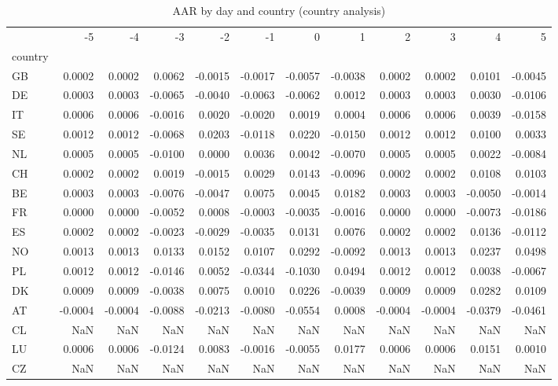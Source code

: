 \begin{table}
\caption{AAR by day and country (country analysis)}
\label{tab:country_aar}
\begin{tabular}{lrrrrrrrrrrr}
\toprule
 & -5 & -4 & -3 & -2 & -1 & 0 & 1 & 2 & 3 & 4 & 5 \\
country &  &  &  &  &  &  &  &  &  &  &  \\
\midrule
GB & 0.0002 & 0.0002 & 0.0062 & -0.0015 & -0.0017 & -0.0057 & -0.0038 & 0.0002 & 0.0002 & 0.0101 & -0.0045 \\
DE & 0.0003 & 0.0003 & -0.0065 & -0.0040 & -0.0063 & -0.0062 & 0.0012 & 0.0003 & 0.0003 & 0.0030 & -0.0106 \\
IT & 0.0006 & 0.0006 & -0.0016 & 0.0020 & -0.0020 & 0.0019 & 0.0004 & 0.0006 & 0.0006 & 0.0039 & -0.0158 \\
SE & 0.0012 & 0.0012 & -0.0068 & 0.0203 & -0.0118 & 0.0220 & -0.0150 & 0.0012 & 0.0012 & 0.0100 & 0.0033 \\
NL & 0.0005 & 0.0005 & -0.0100 & 0.0000 & 0.0036 & 0.0042 & -0.0070 & 0.0005 & 0.0005 & 0.0022 & -0.0084 \\
CH & 0.0002 & 0.0002 & 0.0019 & -0.0015 & 0.0029 & 0.0143 & -0.0096 & 0.0002 & 0.0002 & 0.0108 & 0.0103 \\
BE & 0.0003 & 0.0003 & -0.0076 & -0.0047 & 0.0075 & 0.0045 & 0.0182 & 0.0003 & 0.0003 & -0.0050 & -0.0014 \\
FR & 0.0000 & 0.0000 & -0.0052 & 0.0008 & -0.0003 & -0.0035 & -0.0016 & 0.0000 & 0.0000 & -0.0073 & -0.0186 \\
ES & 0.0002 & 0.0002 & -0.0023 & -0.0029 & -0.0035 & 0.0131 & 0.0076 & 0.0002 & 0.0002 & 0.0136 & -0.0112 \\
NO & 0.0013 & 0.0013 & 0.0133 & 0.0152 & 0.0107 & 0.0292 & -0.0092 & 0.0013 & 0.0013 & 0.0237 & 0.0498 \\
PL & 0.0012 & 0.0012 & -0.0146 & 0.0052 & -0.0344 & -0.1030 & 0.0494 & 0.0012 & 0.0012 & 0.0038 & -0.0067 \\
DK & 0.0009 & 0.0009 & -0.0038 & 0.0075 & 0.0010 & 0.0226 & -0.0039 & 0.0009 & 0.0009 & 0.0282 & 0.0109 \\
AT & -0.0004 & -0.0004 & -0.0088 & -0.0213 & -0.0080 & -0.0554 & 0.0008 & -0.0004 & -0.0004 & -0.0379 & -0.0461 \\
CL & NaN & NaN & NaN & NaN & NaN & NaN & NaN & NaN & NaN & NaN & NaN \\
LU & 0.0006 & 0.0006 & -0.0124 & 0.0083 & -0.0016 & -0.0055 & 0.0177 & 0.0006 & 0.0006 & 0.0151 & 0.0010 \\
CZ & NaN & NaN & NaN & NaN & NaN & NaN & NaN & NaN & NaN & NaN & NaN \\

\end{tabular}
\end{table}
